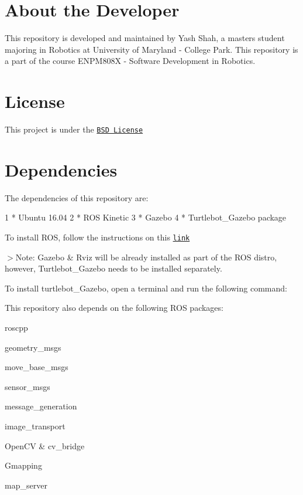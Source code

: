   

\section*{About the Developer}

This repository is developed and maintained by Yash Shah, a masters student majoring in Robotics at University of Maryland -\/ College Park. This repository is a part of the course E\+N\+P\+M808X -\/ Software Development in Robotics.

\section*{License}

This project is under the \href{https://github.com/ysshah95/Pytheas/blob/master/LICENSE}{\tt B\+SD License}

\section*{Dependencies}

The dependencies of this repository are\+: 
\begin{DoxyCode}
1 * Ubuntu 16.04
2 * ROS Kinetic
3 * Gazebo
4 * Turtlebot\_Gazebo package
\end{DoxyCode}


To install R\+OS, follow the instructions on this \href{http://wiki.ros.org/kinetic/Installation}{\tt link}

$>$Note\+: Gazebo \& Rviz will be already installed as part of the R\+OS distro, however, Turtlebot\+\_\+\+Gazebo needs to be installed separately.

To install turtlebot\+\_\+\+Gazebo, open a terminal and run the following command\+:




This repository also depends on the following R\+OS packages\+:
\begin{DoxyItemize}
\item roscpp
\item geometry\+\_\+msgs
\item move\+\_\+base\+\_\+msgs
\item sensor\+\_\+msgs
\item message\+\_\+generation
\item image\+\_\+transport
\item Open\+CV \& cv\+\_\+bridge
\item Gmapping
\item map\+\_\+server
\end{DoxyItemize}

